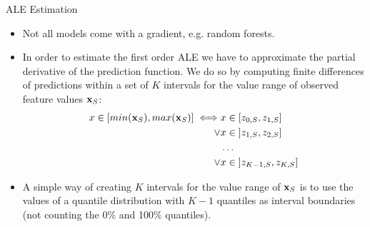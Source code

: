 \documentclass[11pt,compress,t,notes=noshow, xcolor=table]{beamer}
\begin{document}
\begin{vbframe}{ALE Estimation}

\begin{itemize}
  \item Not all models come with a gradient, e.g. random forests.
  \item In order to estimate the first order ALE we have to approximate the partial derivative of the prediction function. We do so by computing finite differences of predictions within a set of $K$ intervals for the value range of observed feature values $\xv_S$:
  $$
  \begin{aligned}
  x \in [min(\xv_S), max(\xv_S)] \iff &x \in [z_{0, S}, z_{1, S}] \\
  \lor &x \in \; ]z_{1, S}, z_{2, S}] \\
  &\dots \\
  \lor &x \in \; ]z_{K-1, S}, z_{K, S}]
  \end{aligned}
  $$
  \item A simple way of creating $K$ intervals for the value range of $\xv_S$ is to use the values of a quantile distribution with $K-1$ quantiles as interval boundaries (not counting the 0\% and 100\% quantiles).
\end{itemize}

\end{vbframe}
\end{document}

